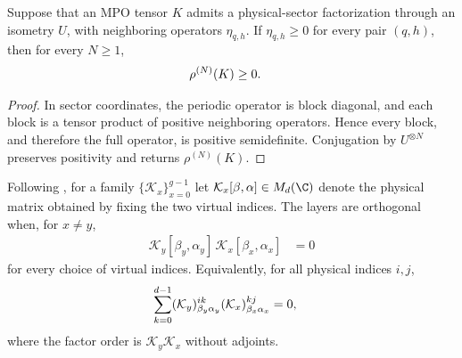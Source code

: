 \begin{lemma}
    \label{thm:mpdo_neighboring_sector_positivity}
    \leanok
    Suppose that an MPO tensor $K$ admits a physical-sector factorization
    through an isometry $U$, with neighboring operators
    $\eta_{q,h}$. If $\eta_{q,h}\geq0$ for every pair $(q,h)$, then for every
    $N\geq1$,
    \begin{align}
        \rho^{(N)}(K) & \geq0.
        \notag
    \end{align}
\end{lemma}

\begin{proof}
    \leanok
    In sector coordinates, the periodic operator is block diagonal, and each
    block is a tensor product of positive neighboring operators. Hence every
    block, and therefore the full operator, is positive semidefinite.
    Conjugation by $U^{\otimes N}$ preserves positivity and returns
    $\rho^{(N)}(K)$.
\end{proof}

\begin{definition}
    \label{def:mpdo_bnt_layer_orthogonality}
    \leanok
    Following \cite[Appendix~C.2, lines~1634--1639]{Cirac2016MPDO_arXiv},
    for a family $\{\mathcal K_x\}_{x=0}^{g-1}$ let
    $\mathcal K_x[\beta,\alpha]\in M_d(\C)$ denote the physical matrix obtained
    by fixing the two virtual indices. The layers are orthogonal when, for
    $x\ne y$,
    \begin{align}
        \mathcal K_y[\beta_y,\alpha_y]\,
        \mathcal K_x[\beta_x,\alpha_x] & =0
        \label{eq:mpdo_bnt_layer_unstarred}
    \end{align}
    for every choice of virtual indices. Equivalently, for all physical
    indices $i,j$,
    \begin{align}
        \sum_{k=0}^{d-1}
        (\mathcal K_y)^{ik}_{\beta_y\alpha_y}
        (\mathcal K_x)^{kj}_{\beta_x\alpha_x} & =0,
        \notag
    \end{align}
    where the factor order is $\mathcal K_y\mathcal K_x$ without adjoints.
\end{definition}

